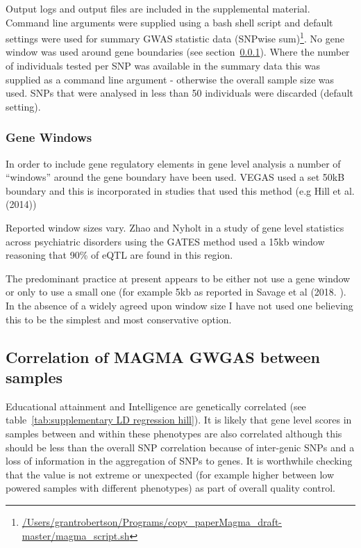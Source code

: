 Output logs and output files are included in the supplemental material.  Command line arguments were supplied using a bash shell script and default settings were used for summary GWAS statistic data (SNPwise sum)\footnote{ \url{/Users/grantrobertson/Programs/copy_paperMagma_draft-master/magma_script.sh}	}. No gene window was used around gene boundaries (see section~\ref{sec:Gene windows}). Where the number of individuals tested per SNP was available in the summary data this was supplied as a command line argument - otherwise the overall sample size was used. SNPs that were analysed in less than 50 individuals were discarded (default setting). 

\subsubsection{Gene Windows}
\label{sec:Gene windows}

 In order to include gene regulatory elements in gene level analysis a number of ``windows''
around the gene boundary have been used. VEGAS \cite{liu2010versatile} used a set 50kB boundary and this is incorporated in studies that used this method (e.g Hill et al. (2014)\cite{hill2014human})


Reported window sizes vary. Zhao and Nyholt \cite{zhao2017gene} in a study of gene level statistics across psychiatric disorders using the GATES method \cite{li2011gates}  used a 15kb window reasoning that 90\% \cite{pickrell2010understanding} of eQTL are found in this region. 

The predominant practice at present appears to be either not use a gene window or only to use a small one (for example 5kb as reported in Savage et al (2018. \cite{savage2018genome}). In the absence of a widely agreed upon window size I have not used one believing this to be the simplest and most conservative option. 




\subsection{Correlation of MAGMA GWGAS between samples}

Educational attainment and Intelligence are genetically correlated\cite{plomin2018new} (see table~\ref{tab:supplementary LD regression hill}). It is likely that gene level scores in samples between and within these phenotypes are also correlated although this should be less than the overall SNP correlation because of inter-genic SNPs and a loss of information in the aggregation of SNPs to genes. It is worthwhile checking that the value is not extreme or unexpected (for example higher between low powered samples with different phenotypes) as part of overall quality control. 

